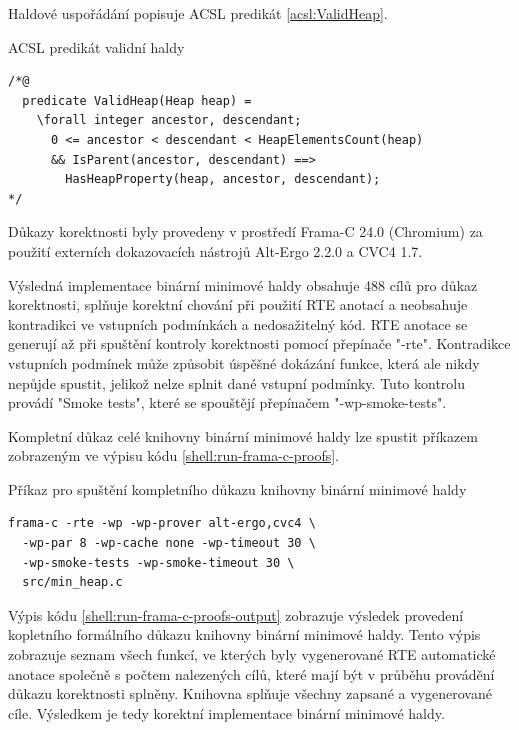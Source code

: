 Haldové uspořádání popisuje ACSL predikát \ref{acsl:ValidHeap}.

\begin{listing}[H]
	\caption{ACSL predikát validní haldy}
	\label{acsl:ValidHeap}
	\begin{verbatim}
/*@
  predicate ValidHeap(Heap heap) =
    \forall integer ancestor, descendant;
      0 <= ancestor < descendant < HeapElementsCount(heap)
      && IsParent(ancestor, descendant) ==>
        HasHeapProperty(heap, ancestor, descendant);
*/
	\end{verbatim}
\end{listing}

Důkazy korektnosti byly provedeny v prostředí Frama-C 24.0 (Chromium) za použití externích dokazovacích nástrojů Alt-Ergo 2.2.0 a CVC4 1.7.

Výsledná implementace binární minimové haldy obsahuje 488 cílů pro důkaz korektnosti, splňuje korektní chování při použití RTE anotací a neobsahuje kontradikci ve vstupních podmínkách a nedosažitelný kód. RTE anotace se generují až při spuštění kontroly korektnosti pomocí přepínače "-rte". Kontradikce vstupních podmínek může způsobit úspěšné dokázání funkce, která ale nikdy nepůjde spustit, jelikož nelze splnit dané vstupní podmínky. Tuto kontrolu provádí "Smoke tests", které se spouštějí přepínačem "-wp-smoke-tests".

Kompletní důkaz celé knihovny binární minimové haldy lze spustit příkazem zobrazeným ve výpisu kódu \ref{shell:run-frama-c-proofs}.

\begin{listing}[H]
	\caption{Příkaz pro spuštění kompletního důkazu knihovny binární minimové haldy}
	\label{shell:run-frama-c-proofs}
	\begin{verbatim}
frama-c -rte -wp -wp-prover alt-ergo,cvc4 \
  -wp-par 8 -wp-cache none -wp-timeout 30 \
  -wp-smoke-tests -wp-smoke-timeout 30 \
  src/min_heap.c
	\end{verbatim}
\end{listing}

Výpis kódu \ref{shell:run-frama-c-proofs-output} zobrazuje výsledek provedení kopletního formálního důkazu knihovny binární minimové haldy. Tento výpis zobrazuje seznam všech funkcí, ve kterých byly vygenerované RTE automatické anotace společně s počtem nalezených cílů, které mají být v průběhu provádění důkazu korektnosti splněny. Knihovna splňuje všechny zapsané a vygenerované cíle. Výsledkem je tedy korektní implementace binární minimové haldy.

